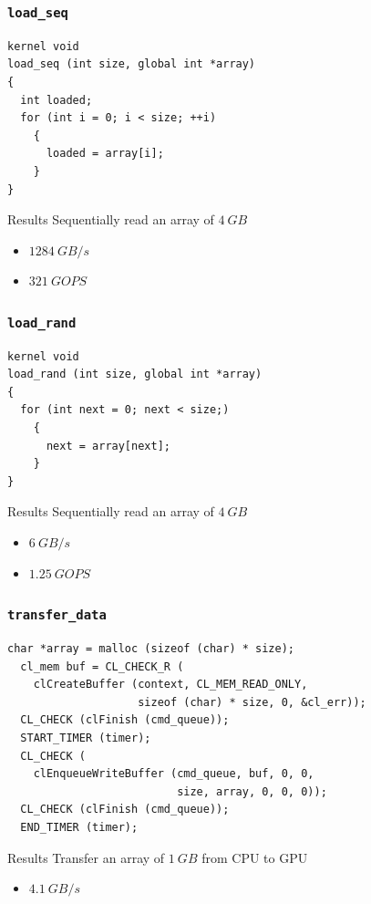 \begin{frame}[fragile]
  \frametitle{\texttt{load\_seq}}
\begin{lstlisting}[basicstyle=\footnotesize]
kernel void
load_seq (int size, global int *array)
{
  int loaded;
  for (int i = 0; i < size; ++i)
    {
      loaded = array[i];
    }
}
\end{lstlisting}
  \pause{}
  \begin{alertblock}{Results}
    Sequentially read an array of \(4~\mathit{GB}\)
    \begin{itemize}
    \item \(1284~\mathit{GB/s}\)
    \item \(321~\mathit{GOPS}\)
    \end{itemize}
  \end{alertblock}
\end{frame}

\begin{frame}[fragile]
  \frametitle{\texttt{load\_rand}}
\begin{lstlisting}[basicstyle=\footnotesize]
kernel void
load_rand (int size, global int *array)
{
  for (int next = 0; next < size;)
    {
      next = array[next];
    }
}
\end{lstlisting}
  \pause{}
  \begin{alertblock}{Results}
    Sequentially read an array of \(4~\mathit{GB}\)
    \begin{itemize}
    \item \(6~\mathit{GB/s}\)
    \item \(1.25~\mathit{GOPS}\)
    \end{itemize}
  \end{alertblock}
\end{frame}

\begin{frame}[fragile]
  \frametitle{\texttt{transfer\_data}}
\begin{lstlisting}[basicstyle=\footnotesize]
  char *array = malloc (sizeof (char) * size);
  cl_mem buf = CL_CHECK_R (
    clCreateBuffer (context, CL_MEM_READ_ONLY,
                    sizeof (char) * size, 0, &cl_err));
  CL_CHECK (clFinish (cmd_queue));
  START_TIMER (timer);
  CL_CHECK (
    clEnqueueWriteBuffer (cmd_queue, buf, 0, 0,
                          size, array, 0, 0, 0));
  CL_CHECK (clFinish (cmd_queue));
  END_TIMER (timer);
\end{lstlisting}
\pause{}
  \begin{alertblock}{Results}
    Transfer an array of \(1~\mathit{GB}\) from CPU to GPU
    \begin{itemize}
    \item \(4.1~\mathit{GB/s}\)
    \end{itemize}
  \end{alertblock}
\end{frame}

